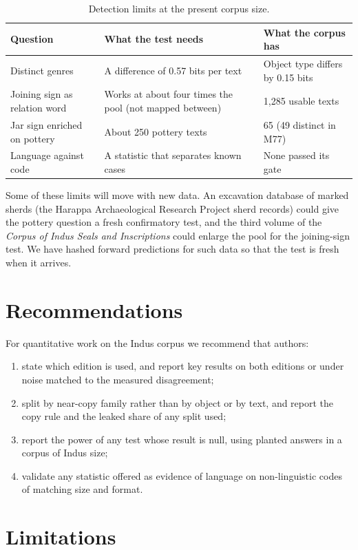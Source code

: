 \documentclass[11pt,a4paper]{article}
\begin{document}
\begin{table}[t]
\centering
\caption{Detection limits at the present corpus size.}
\label{tab:limits}
\begin{tabularx}{\textwidth}{lXX}
\toprule
Question & What the test needs & What the corpus has \\
\midrule
Distinct genres & A difference of 0.57 bits per text & Object type differs by 0.15 bits \\
Joining sign as relation word & Works at about four times the pool (not mapped between) & 1,285 usable texts \\
Jar sign enriched on pottery & About 250 pottery texts & 65 (49 distinct in M77) \\
Language against code & A statistic that separates known cases & None passed its gate \\
\bottomrule
\end{tabularx}
\end{table}

Some of these limits will move with new data. An excavation database of marked sherds (the Harappa Archaeological Research Project sherd records) could give the pottery question a fresh confirmatory test, and the third volume of the \emph{Corpus of Indus Seals and Inscriptions} could enlarge the pool for the joining-sign test. We have hashed forward predictions for such data so that the test is fresh when it arrives.

\section{Recommendations}

For quantitative work on the Indus corpus we recommend that authors:
\begin{enumerate}
  \item state which edition is used, and report key results on both editions or under noise matched to the measured disagreement;
  \item split by near-copy family rather than by object or by text, and report the copy rule and the leaked share of any split used;
  \item report the power of any test whose result is null, using planted answers in a corpus of Indus size;
  \item validate any statistic offered as evidence of language on non-linguistic codes of matching size and format.
\end{enumerate}

\section{Limitations}
\end{document}

